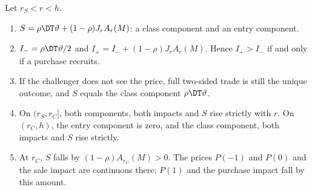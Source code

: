 \begin{proposition}\label{prop:spread}
Let \(r_S<r<h\).
\begin{enumerate}[label=(\roman*),leftmargin=2em]
\item \(S=\rho\DT\vartheta+(1-\rho)J_rA_r(M)\): a class component and an entry component.
\item \(I_-=\rho\DT\vartheta/2\) and \(I_+=I_-+(1-\rho)J_rA_r(M)\). Hence \(I_+>I_-\) if and only if a purchase
recruits.
\item If the challenger does not see the price, full two-sided trade is still the unique outcome, and \(S\) equals
the class component \(\rho\DT\vartheta\).
\item On \((r_S,r_C]\), both components, both impacts and \(S\) rise strictly with \(r\). On \((r_C,h)\), the entry
component is zero, and the class component, both impacts and \(S\) rise strictly.
\item At \(r_C\), \(S\) falls by \((1-\rho)A_{r_C}(M)>0\). The prices \(P(-1)\) and \(P(0)\) and the sale impact are
continuous there; \(P(1)\) and the purchase impact fall by this amount.
\end{enumerate}
\end{proposition}

